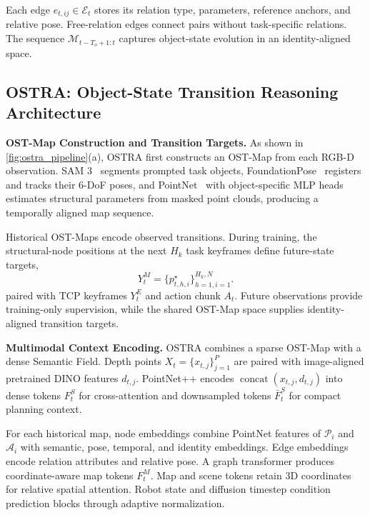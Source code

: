 Each edge $e_{t,ij}\in\mathcal{E}_t$ stores its relation type, parameters,
reference anchors, and relative pose. Free-relation edges connect pairs without
task-specific relations. The sequence $\mathcal{M}_{t-T_o+1:t}$ captures
object-state evolution in an identity-aligned space.


\subsection{OSTRA: Object-State Transition Reasoning Architecture}
\label{sec:ostra}

\textbf{OST-Map Construction and Transition Targets.}
As shown in \cref{fig:ostra_pipeline}(a), OSTRA first constructs an OST-Map
from each RGB-D observation. SAM 3~\citep{sam3} segments prompted task objects,
FoundationPose~\citep{foundationposewen2024} registers and tracks their 6-DoF
poses, and PointNet~\citep{Qi2017PointNet} with object-specific MLP heads
estimates structural parameters from masked point clouds, producing a
temporally aligned map sequence.

Historical OST-Maps encode observed transitions. During training, the
structural-node positions at the next $H_k$ task keyframes define future-state
targets, 
\begin{equation}
    Y_t^{M}
    =
    \{p^{\star}_{t,h,i}\}_{h=1,i=1}^{H_k,N}.
    \label{eq:future_map_target}
\end{equation}
paired with TCP keyframes $Y_t^{E}$ and action chunk $A_t$. Future observations
provide training-only supervision, while the shared OST-Map space supplies
identity-aligned transition targets.


\textbf{Multimodal Context Encoding.}
OSTRA combines a sparse OST-Map with a dense Semantic Field. Depth points
$X_t=\{x_{t,j}\}_{j=1}^{P}$ are paired with image-aligned pretrained DINO
features $d_{t,j}$. PointNet++ encodes
$\operatorname{concat}(x_{t,j},d_{t,j})$ into dense tokens
$F_t^{S}$ for cross-attention and downsampled tokens $\bar{F}_t^{S}$ for compact
planning context.

For each historical map, node embeddings combine PointNet features of
$\mathcal{P}_i$ and $\mathcal{A}_i$ with semantic, pose, temporal, and identity
embeddings. Edge embeddings encode relation attributes and relative pose. A
graph transformer produces coordinate-aware map tokens $F_t^{M}$. Map and scene
tokens retain 3D coordinates for relative spatial attention. Robot state and
diffusion timestep condition prediction blocks through adaptive normalization.


